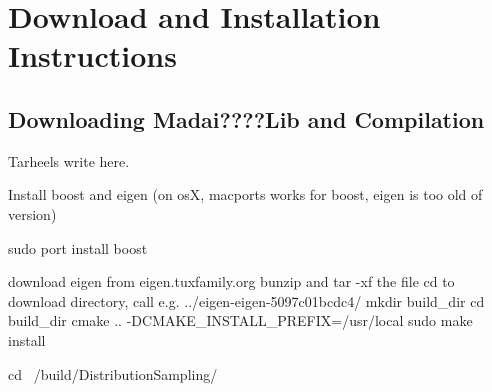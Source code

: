 \section{Download and Installation Instructions}


\subsection{Downloading Madai????Lib and Compilation}
Tarheels write here.


Install boost and eigen (on osX, macports works for boost, eigen is too old of version)

sudo port install boost


download eigen from eigen.tuxfamily.org
bunzip and tar -xf the file
cd to download directory, call e.g. ../eigen-eigen-5097c01bcdc4/
mkdir build\_dir
cd build\_dir
cmake .. -DCMAKE\_INSTALL\_PREFIX=/usr/local
sudo make install

cd ~/build/DistributionSampling/
